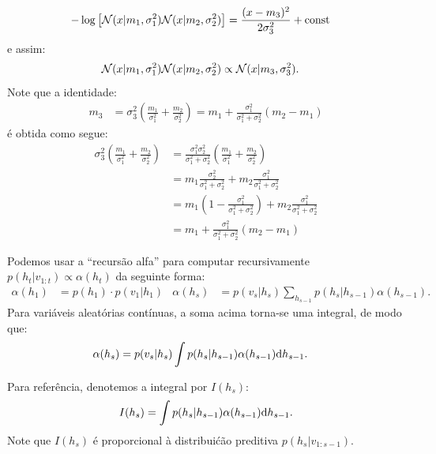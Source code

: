 \begin{exenumerate}
\begin{solution}
\begin{align}
            -\log \left[\mathcal{N}(x | m_1, \sigma_1^2) \mathcal{N}(x | m_2, \sigma_2^2) \right]  & = \frac{ (x-m_3)^2 }{2 \sigma_3^2} + \text{const}
        \end{align}
        e assim:
        \begin{align}
            \mathcal{N}(x | m_1, \sigma_1^2) \mathcal{N}(x | m_2, \sigma_2^2) & \propto  \mathcal{N}(x | m_3, \sigma_3^2).
        \end{align}
        Note que a identidade:
        \begin{align}
            m_3 & = \sigma_3^2\left( \frac{m_1}{\sigma_1^2}+ \frac{m_2}{\sigma_2^2}\right) = m_1 + \frac{\sigma_1^2}{\sigma_1^2+\sigma_2^2}(m_2-m_1)
        \end{align}
        \'e obtida como segue:
        \begin{align}
            \sigma_3^2\left( \frac{m_1}{\sigma_1^2}+ \frac{m_2}{\sigma_2^2}\right) & =  \frac{\sigma_1^2 \sigma_2^2}{\sigma_1^2+\sigma_2^2}\left( \frac{m_1}{\sigma_1^2}+ \frac{m_2}{\sigma_2^2}\right)\\
            & =  m_1 \frac{\sigma_2^2}{\sigma_1^2+\sigma_2^2}+ m_2 \frac{\sigma_1^2}{\sigma_1^2+\sigma_2^2}\\
            & = m_1 \left(1- \frac{\sigma_1^2}{\sigma_1^2+\sigma_2^2}\right) + m_2 \frac{\sigma_1^2}{\sigma_1^2+\sigma_2^2}\\
            & = m_1 + \frac{\sigma_1^2}{\sigma_1^2+\sigma_2^2} (m_2-m_1)
        \end{align}
        
    \end{solution}
    
    
    \item Podemos usar a ``recurs\~ao alfa'' para computar recursivamente $p(h_t | v_{1:t}) \propto
    \alpha(h_t)$ da seguinte forma:
    \begin{align}
        \alpha(h_1) & = p(h_1) \cdot  p(v_1 | h_1) &
        \alpha(h_s) &=  p(v_s | h_s) \sum_{h_{s-1}} p(h_s | h_{s-1}) \alpha(h_{s-1}).
    \end{align}
    Para vari\'aveis aleat\'orias cont\'inuas, a soma acima torna-se uma integral, de modo que:
    \begin{align}
        \alpha(h_s) &=  p(v_s | h_s) \int p(h_s | h_{s-1}) \alpha(h_{s-1}) \mathrm{d} h_{s-1}.
        \label{eq:cont-alpha-alt}
    \end{align}
    
    Para refer\^encia, denotemos a integral por $I(h_s)$:
    \begin{equation}
        I(h_s) = \int p(h_s | h_{s-1}) \alpha(h_{s-1}) \mathrm{d} h_{s-1}.
        \label{eq:I-def-kalman-alt}
    \end{equation}
    Note que $I(h_s)$ \'e proporcional \`a distribui\'c\~ao preditiva $p(h_s | v_{1:s-1})$.
    

\end{exenumerate}
